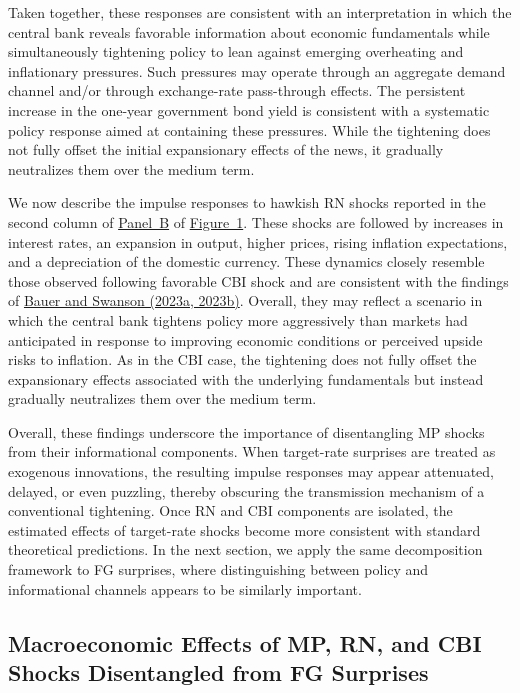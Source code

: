 \documentclass[12pt, reqno]{article}
\begin{document}
Taken together, these responses are consistent with an interpretation in which the central bank reveals favorable information about economic fundamentals while simultaneously tightening policy to lean against emerging overheating and inflationary pressures. Such pressures may operate through an aggregate demand channel and/or through exchange-rate pass-through effects. The persistent increase in the one-year government bond yield is consistent with a systematic policy response aimed at containing these pressures. While the tightening does not fully offset the initial expansionary effects of the news, it gradually neutralizes them over the medium term.

We now describe the impulse responses to hawkish RN shocks reported in the second column of \hyperlink{Panel BF1}{Panel~B} of \hyperlink{Figure~1}{Figure~1}. These shocks are followed by increases in interest rates, an expansion in output, higher prices, rising inflation expectations, and a depreciation of the domestic currency. These dynamics closely resemble those observed following favorable CBI shock and are consistent with the findings of \hyperlink{Bauer and Swanson (2023a, 2023b)}{Bauer and Swanson (2023a, 2023b)}. Overall, they may reflect a scenario in which the central bank tightens policy more aggressively than markets had anticipated in response to improving economic conditions or perceived upside risks to inflation. As in the CBI case, the tightening does not fully offset the expansionary effects associated with the underlying fundamentals but instead gradually neutralizes them over the medium term. 

Overall, these findings underscore the importance of disentangling MP shocks from their informational components. When target-rate surprises are treated as exogenous innovations, the resulting impulse responses may appear attenuated, delayed, or even puzzling, thereby obscuring the transmission mechanism of a conventional tightening. Once RN and CBI components are  isolated, the estimated effects of target-rate shocks become more consistent with standard theoretical predictions. In the next section, we apply the same decomposition framework to FG surprises, where distinguishing between policy and informational channels appears to be similarly important.




\subsection{Macroeconomic Effects of MP, RN, and CBI Shocks Disentangled from FG Surprises}
\end{document}
